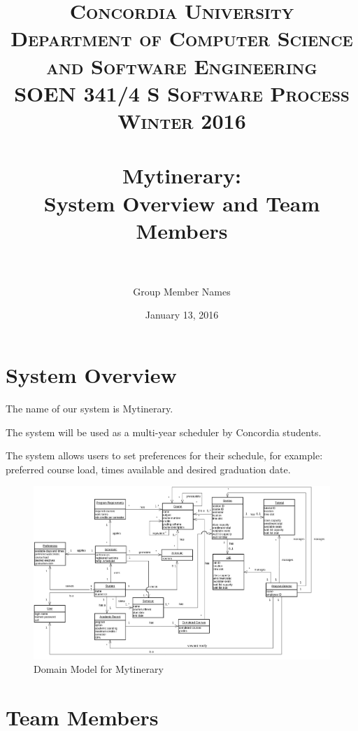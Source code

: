 \documentclass[paper=a4, fontsize=11pt, oneside]{scrartcl} %
\title{	
\normalfont \normalsize 
\textsc{Concordia University} \\
\textsc{Department of Computer Science and Software Engineering} \\
\textsc{SOEN 341/4 S \quad Software Process \quad Winter 2016} \\ [25pt] %
\horrule{0.5pt} \\[0.4cm] %
\huge Mytinerary: \\ System Overview and Team Members \\ %
\horrule{2pt} \\[0.5cm] %
}
\author{Group Member Names} %
\date{\normalsize January 13, 2016} %
\begin{document}
\maketitle %


\section*{System Overview}
The name of our system is Mytinerary.

The system will be used as a multi-year scheduler by Concordia students.

The system allows users to set preferences for their schedule, for example: preferred course load, times available and desired graduation date.

\begin{figure}[H]
\centering
\includegraphics[width=1.4\textwidth, angle=-90]{domain_model}
\caption{Domain Model for Mytinerary}
\label{fig:DM}
\end{figure}

\newpage
\section*{Team Members}
\end{document}
